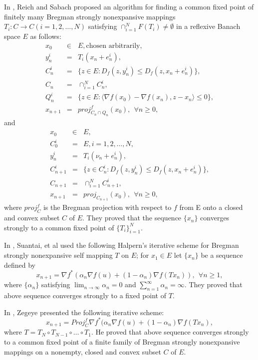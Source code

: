 \documentclass[reqno,b5paper]{amsart}
\theoremstyle{plain}
\theoremstyle{definition}
\numberwithin{equation}{section}
\numberwithin{equation}{section}
\begin{document}
In \cite{rei}, Reich and Sabach proposed an algorithm for finding a common fixed point of finitely many Bregman strongly nonexpansive mappings $T_{i}:C\to C (i=1,2,\ldots, N)$ satisfying $\cap_{i=1}^{N}F(T_{i})\neq \emptyset$ in a reflexive Banach space $E$ as follows:
\begin{eqnarray*}
x_{0}&\in & E, \text{chosen arbitrarily,}\\
y_{n}^{i}&=&T_{i}(x_{n}+e_{n}^{i}),\\
C_{n}^{i}&=&\{z\in E : D_{f}(z,y_{n}^{i})\leq D_{f}(z,x_{n}+e_{n}^{i})\},\\
C_{n}&=&\cap_{i=1}^{N}C_{n}^{i},\\
Q_{n}^{i}&=&\{z\in E : \langle \nabla f(x_{0})-\nabla f(x_{n}), z-x_{n}\rangle\leq 0\},\\
x_{n+1}&=&proj_{C_{n}\cap Q_{n}}^{f}(x_{0}), \ \ \forall n\geq0,
\end{eqnarray*}
and
\begin{eqnarray*}
x_{0}&\in & E,\\
C_{0}^{i}&=&E, i=1,2,\ldots,N,\\
y_{n}^{i}&=&T_{i}(\nu_{n}+e_{n}^{i}),\\
C_{n+1}^{i}&=&\{z\in C_{n}^{i} : D_{f}(z,y_{n}^{i})\leq D_{f}(z,x_{n}+e_{n}^{i})\},\\
C_{n+1}&=&\cap_{i=1}^{N}C_{n+1}^{i},\\
x_{n+1}&=&proj_{C_{n+1}}(x_{0}), \ \ \forall n\geq0,
\end{eqnarray*}
where $proj_{C}^{f}$ is the Bregman projection with respect to $f$ from E onto  a closed and convex subset $C$ of $E$. They proved that the sequence $\{x_{n}\}$ converges strongly to a common fixed point of $\{T_{i}\}_{i=1}^{N}$.

In \cite{sua}, Suantai, et al used the following Halpern's iterative scheme for Bregman strongly nonexpansive self mapping $T$ on $E$; for $x_{1}\in E$ let $\{x_{n}\}$ be a sequence defined by
$$x_{n+1}=\nabla f^{*}(\alpha_{n}\nabla f(u)+(1-\alpha_{n})\nabla f(Tx_{n})), \ \ \forall n\geq1,$$
where $\{\alpha_{n}\}$ satisfying $\lim_{n\to\infty}\alpha_{n}=0$ and $\sum_{n=1}^{\infty}\alpha_{n}=\infty$. They proved that above sequence converges strongly to a fixed point of $T$.

In \cite{zeg}, Zegeye presented the following iterative scheme:
$$x_{n+1}=Proj_{C}^{f}\nabla f^{*}(\alpha_{n}\nabla f(u)+(1-\alpha_{n})\nabla f(Tx_{n}),$$
where $T=T_{N}\circ T_{N-1}\circ \ldots\circ T_{1}$. He proved that above sequence converges strongly to a common fixed point of a finite family of Bregman strongly nonexpansive mappings on a nonempty, closed and convex subset $C$ of $E$.
\end{document}
